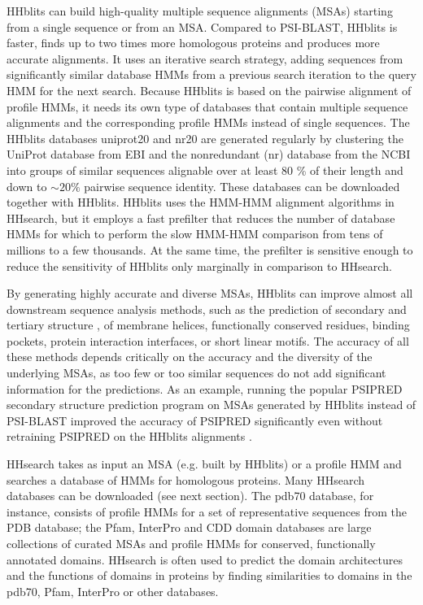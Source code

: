 \documentclass[11pt,a4paper]{article}
\begin{document}
HHblits can build high-quality multiple sequence alignments (MSAs) starting from a single sequence or from an MSA. Compared to PSI-BLAST, HHblits is faster, finds up to two times more homologous proteins and produces more accurate alignments. It uses an iterative search strategy, adding sequences from significantly similar database HMMs from a previous search iteration to the query HMM for the next search. Because HHblits is based on the pairwise alignment of profile HMMs, it needs its own type of databases that contain multiple sequence alignments and the corresponding profile HMMs instead of single sequences. The HHblits databases uniprot20 and nr20 are generated regularly by clustering the UniProt database from EBI and the nonredundant (nr) database from the NCBI into groups of similar sequences alignable over at least 80 \% of their length and down to $\sim 20 \%$ pairwise sequence identity. These databases can be downloaded together with HHblits. HHblits uses the HMM-HMM alignment algorithms in HHsearch, but it employs a fast prefilter that reduces the number of database HMMs for which to perform the slow HMM-HMM comparison from tens of millions to a few thousands. At the same time, the prefilter is sensitive enough to reduce the sensitivity of HHblits only marginally in comparison to HHsearch. 

By generating highly accurate and diverse MSAs, HHblits can improve almost all downstream sequence analysis methods, such as the prediction of secondary and tertiary structure \cite{Jones:1999, Marks:2011}, of membrane helices, functionally conserved residues, binding pockets, protein interaction interfaces, or short linear motifs. The accuracy of all these methods depends critically on the accuracy and the diversity of the underlying MSAs, as too few or too similar sequences do not add significant information for the predictions. As an example, running the popular PSIPRED secondary structure prediction program \cite{Jones:1999} on MSAs generated by HHblits instead of PSI-BLAST improved the accuracy of PSIPRED significantly even without retraining PSIPRED on the HHblits alignments \cite{Remmert:2011}. 

HHsearch takes as input an MSA (e.g. built by HHblits) or a profile HMM and searches a database of HMMs for homologous proteins. Many HHsearch databases can be downloaded (see next section). The pdb70 database, for instance, consists of profile HMMs for a set of representative sequences from the PDB database; the Pfam, InterPro and CDD domain databases are large collections of curated MSAs and profile HMMs for conserved, functionally annotated domains. HHsearch is often used to predict the domain architectures and the functions of domains in proteins by finding similarities to domains in the pdb70, Pfam, InterPro or other databases. 
\end{document}
